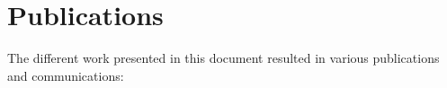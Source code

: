 \documentclass[../thesis.tex]{subfiles}
\begin{document}







\section{Publications}
\label{sec:intro:publications}

The different work presented in this document resulted in various publications and communications:






\biblio{}
\end{document}
